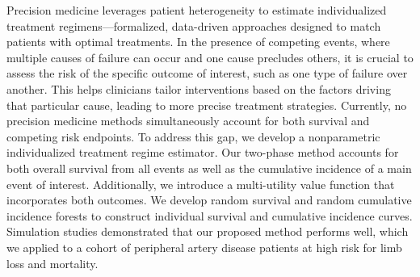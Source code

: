 Precision medicine leverages patient heterogeneity to estimate individualized treatment regimens—formalized, data-driven approaches designed to match patients with optimal treatments. In the presence of competing events, where multiple causes of failure can occur and one cause precludes others, it is crucial to assess the risk of the specific outcome of interest, such as one type of failure over another. This helps clinicians tailor interventions based on the factors driving that particular cause, leading to more precise treatment strategies. Currently, no precision medicine methods simultaneously account for both survival and competing risk endpoints. To address this gap, we develop a nonparametric individualized treatment regime estimator. Our two-phase method accounts for both overall survival from all events as well as the cumulative incidence of a main event of interest. Additionally, we introduce a multi-utility value function that incorporates both outcomes. We develop random survival and random cumulative incidence forests to construct individual survival and cumulative incidence curves. Simulation studies demonstrated that our proposed method performs well, which we applied to a cohort of peripheral artery disease patients at high risk for limb loss and mortality.